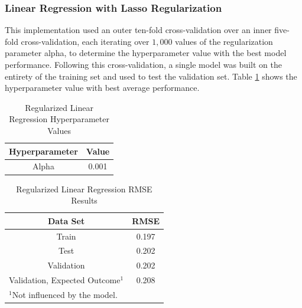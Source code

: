 \documentclass[conference]{IEEEtran}
\begin{document}
\subsubsection{Linear Regression with Lasso Regularization}
This implementation used an outer ten-fold cross-validation over an inner five-fold cross-validation, each iterating over $1,000$ values of the regularization parameter alpha, to determine the hyperparameter value with the best model performance. Following this cross-validation, a single model was built on the entirety of the training set and used to test the validation set. Table \ref{tab2} shows the hyperparameter value with best average performance. 

\begin{table}[htbp]
\caption{Regularized Linear Regression Hyperparameter Values}
\begin{center}
\begin{tabular}{|c||c|}
\hline
\textbf{Hyperparameter} & \textbf{Value} \\
\hline
\hline
Alpha & 0.001 \\
\hline
\end{tabular}
\label{tab2}
\end{center}
\end{table}

\begin{table}[htbp]
\caption{Regularized Linear Regression RMSE Results}
\begin{center}
\begin{tabular}{|c||c|}
\hline
\textbf{Data Set} & \textbf{RMSE} \\
\hline
\hline
Train & 0.197 \\
\hline
Test & 0.202 \\
\hline
Validation & 0.202 \\
\hline
Validation, Expected Outcome$^{\mathrm{1}}$ & 0.208 \\
\hline
\multicolumn{2}{l}{$^{\mathrm{1}}$Not influenced by the model.}
\end{tabular}
\label{tab3}
\end{center}
\end{table}
\end{document}
